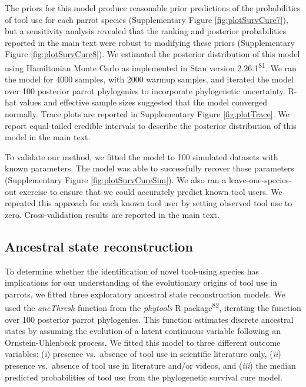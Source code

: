 \documentclass[
  man,floatsintext]{apa6}
\begin{document}
The priors for this model produce reasonable prior predictions of the
probabilities of tool use for each parrot species (Supplementary Figure
\ref{fig:plotSurvCure7}), but a sensitivity analysis revealed that the ranking
and posterior probabilities reported in the main text were robust to modifying
these priors (Supplementary Figure \ref{fig:plotSurvCure8}). We estimated the
posterior distribution of this model using Hamiltonian Monte Carlo as
implemented in Stan version 2.26.1\textsuperscript{81}. We ran the model for 4000
samples, with 2000 warmup samples, and iterated the model over 100 posterior
parrot phylogenies to incorporate phylogenetic uncertainty. R-hat values and
effective sample sizes suggested that the model converged normally. Trace plots
are reported in Supplementary Figure \ref{fig:plotTrace}. We report
equal-tailed credible intervals to describe the posterior distribution of this
model in the main text.

To validate our method, we fitted the model to 100 simulated datasets with known
parameters. The model was able to successfully recover those parameters
(Supplementary Figure \ref{fig:plotSurvCureSim}). We also ran a
leave-one-species-out exercise to ensure that we could accurately predict known
tool users. We repeated this approach for each known tool user by setting
observed tool use to zero. Cross-validation results are reported in the main
text.

\hypertarget{ancestral-state-reconstruction}{%
\subsection{Ancestral state reconstruction}\label{ancestral-state-reconstruction}}

To determine whether the identification of novel tool-using species has
implications for our understanding of the evolutionary origins of tool use in
parrots, we fitted three exploratory ancestral state reconstruction models. We
used the \emph{ancThresh} function from the \emph{phytools} R package\textsuperscript{82},
iterating the function over 100 posterior parrot phylogenies. This function
estimates discrete ancestral states by assuming the evolution of a latent
continuous variable following an Ornstein-Uhlenbeck process. We fitted this
model to three different outcome variables: (\emph{i}) presence vs.~absence of tool
use in scientific literature only, (\emph{ii}) presence vs.~absence of tool use in
literature and/or videos, and (\emph{iii}) the median predicted probabilities of tool
use from the phylogenetic survival cure model.
\end{document}
